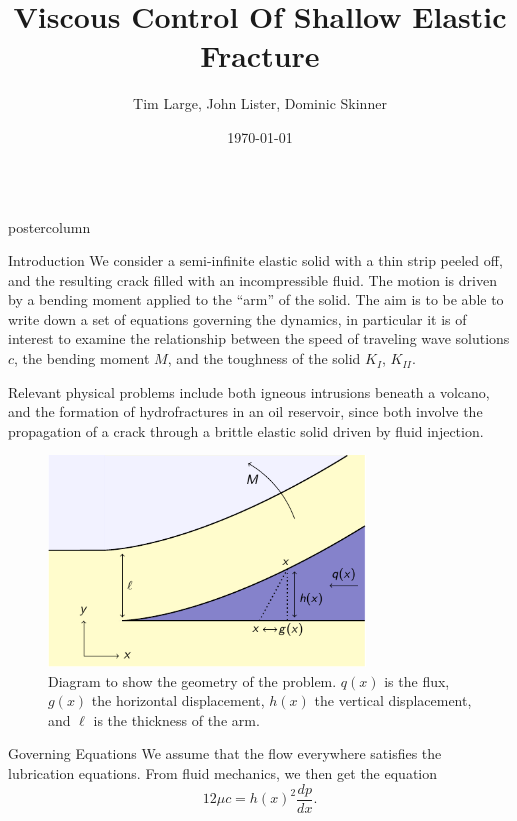 \documentclass{beamer}
\title{\huge Viscous Control Of Shallow Elastic Fracture}
\author{Tim Large, John Lister, Dominic Skinner}
\institute[Univerity of Cambridge]
{Department of Applied Mathematics and Theoretical Physics, University of Cambridge}
\date{\today}
\newlength{\columnheight}
\begin{document}
\begin{frame}
\begin{columns}
	\begin{column}{.43\textwidth}
		\begin{beamercolorbox}[center]{postercolumn}
			\begin{minipage}{.98\textwidth}  %
				\parbox[t][\columnheight]{\textwidth}{ %
\begin{myblock}{Introduction}
We consider a semi-infinite elastic solid with a thin strip peeled off, and the
resulting crack filled with an incompressible fluid. The motion is driven
by a bending moment applied to the ``arm'' of the solid. The aim is to be
able to write down a set of equations governing the dynamics, in particular
it is of interest to examine the relationship between the speed of traveling
wave solutions $c$, the bending moment $M$, and the toughness 
of the solid $K_I$, $K_{II}$. 

Relevant physical problems include both igneous intrusions beneath a volcano,
and the formation of hydrofractures in an oil
reservoir, since both involve the propagation of a crack through a brittle 
elastic solid driven by fluid injection.

\begin{figure}
\centering\includegraphics[width=0.75\textwidth]{../Fig10.pdf}
\caption{Diagram to show the geometry of the problem. $q(x)$ is the flux,
$g(x)$ the horizontal displacement, $h(x)$ the vertical displacement, and
$\ell$ is the thickness of the arm.}
\end{figure}
\end{myblock}\vfill
\begin{myblock}{Governing Equations}
We assume that the flow everywhere satisfies the lubrication equations. From 
fluid mechanics, we then get the equation
\[12\mu c = h(x)^2 \frac{dp}{dx}.\]


\end{myblock}}
\end{minipage}
\end{beamercolorbox}
\end{column}
\end{columns}
\end{frame}
\end{document}
